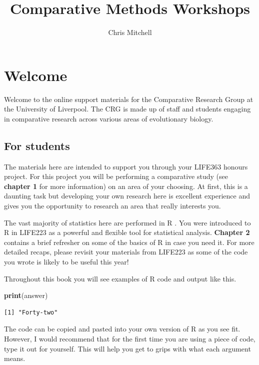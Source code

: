 \documentclass[
]{book}
\title{Comparative Methods Workshops}
\author{Chris Mitchell}
\date{}
\newenvironment{Shaded}{\begin{snugshade}}{\end{snugshade}}
\newcommand{\KeywordTok}[1]{\textcolor[rgb]{0.13,0.29,0.53}{\textbf{#1}}}
\newcommand{\NormalTok}[1]{#1}
\begin{document}
\maketitle

{
\setcounter{tocdepth}{1}
\tableofcontents
}
\hypertarget{welcome}{%
\chapter{Welcome}\label{welcome}}

Welcome to the online support materials for the Comparative Research Group at the University of Liverpool. The CRG is made up of staff and students engaging in comparative research across various areas of evolutionary biology.

\hypertarget{for-students}{%
\section{For students}\label{for-students}}

The materials here are intended to support you through your LIFE363 honours project. For this project you will be performing a comparative study (see \textbf{chapter 1} for more information) on an area of your choosing. At first, this is a daunting task but developing your own research here is excellent experience and gives you the opportunity to research an area that really interests you.

The vast majority of statistics here are performed in R \citep{R}. You were introduced to R in LIFE223 as a powerful and flexible tool for statistical analysis. \textbf{Chapter 2} contains a brief refresher on some of the basics of R in case you need it. For more detailed recaps, please revisit your materials from LIFE223 as some of the code you wrote is likely to be useful this year!

Throughout this book you will see examples of R code and output like this.

\begin{Shaded}
\begin{Highlighting}[]
\KeywordTok{print}\NormalTok{(answer)}
\end{Highlighting}
\end{Shaded}

\begin{verbatim}
[1] "Forty-two"
\end{verbatim}

The code can be copied and pasted into your own version of R as you see fit. However, I would recommend that for the first time you are using a piece of code, type it out for yourself. This will help you get to grips with what each argument means.
\end{document}
